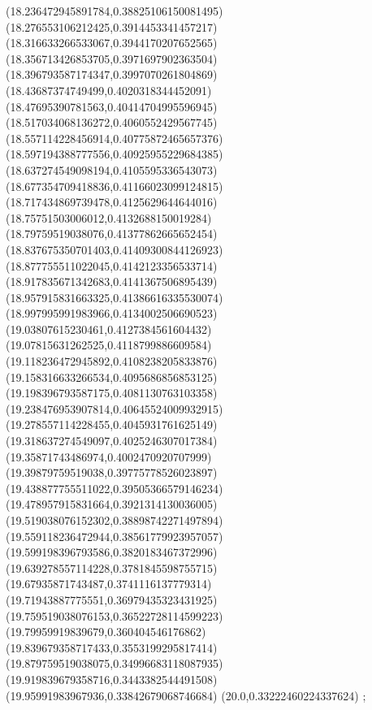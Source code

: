 {(18.236472945891784,0.38825106150081495)
(18.276553106212425,0.3914453341457217)
(18.316633266533067,0.3944170207652565)
(18.356713426853705,0.3971697902363504)
(18.396793587174347,0.3997070261804869)
(18.43687374749499,0.4020318344452091)
(18.47695390781563,0.40414704995596945)
(18.517034068136272,0.4060552429567745)
(18.557114228456914,0.40775872465657376)
(18.597194388777556,0.40925955229684385)
(18.637274549098194,0.4105595336543073)
(18.677354709418836,0.41166023099124815)
(18.717434869739478,0.4125629644644016)
(18.75751503006012,0.4132688150019284)
(18.79759519038076,0.41377862665652454)
(18.837675350701403,0.41409300844126923)
(18.877755511022045,0.4142123356533714)
(18.917835671342683,0.4141367506895439)
(18.957915831663325,0.41386616335530074)
(18.997995991983966,0.4134002506690523)
(19.03807615230461,0.4127384561604432)
(19.07815631262525,0.4118799886609584)
(19.118236472945892,0.4108238205833876)
(19.158316633266534,0.4095686856853125)
(19.198396793587175,0.4081130763103358)
(19.238476953907814,0.40645524009932915)
(19.278557114228455,0.4045931761625149)
(19.318637274549097,0.4025246307017384)
(19.35871743486974,0.4002470920707999)
(19.39879759519038,0.39775778526023897)
(19.438877755511022,0.39505366579146234)
(19.478957915831664,0.3921314130036005)
(19.519038076152302,0.38898742271497894)
(19.559118236472944,0.38561779923957057)
(19.599198396793586,0.3820183467372996)
(19.639278557114228,0.3781845598755715)
(19.67935871743487,0.3741116137779314)
(19.71943887775551,0.36979435323431925)
(19.759519038076153,0.36522728114599223)
(19.79959919839679,0.360404546176862)
(19.839679358717433,0.3553199295817414)
(19.879759519038075,0.34996683118087935)
(19.919839679358716,0.3443382544491508)
(19.95991983967936,0.33842679068746684)
(20.0,0.33222460224337624)
};
